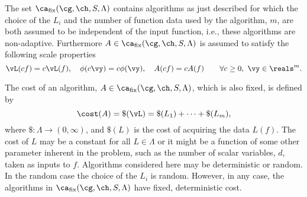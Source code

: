 \documentclass[final]{elsarticle}
\theoremstyle{definition}
\theoremstyle{remark}
\DeclareMathOperator{\fix}{fix}
\begin{document}
The set $\ca_{\fix}(\cg,\ch,S,\Lambda)$ contains algorithms as just described for which the choice of the $L_i$ and the number of function data used by the algorithm, $m$, are both assumed to be independent of the input function, i.e., these algorithms are non-adaptive.  Furthermore $A \in \ca_{\fix}(\cg,\ch,S,\Lambda)$ is assumed to satisfy the following scale properties
\begin{equation}
\label{algoscale}
\vL(cf) = c \vL(f), \quad 
\phi(c\vy) = c\phi(\vy), \quad A(cf) = cA(f) \qquad \forall c \ge 0, \ \vy \in \reals^m.
\end{equation}

The cost of an algorithm, $A \in  \ca_{\fix}(\cg,\ch,S,\Lambda)$, which is also fixed, is defined by
\begin{equation} \label{costfix}
\cost(A) = \$(\vL) = \$(L_1) + \cdots +\$(L_m),
\end{equation}
where $\$:\Lambda \to (0,\infty)$, and $\$(L)$ is the cost of acquiring the data $L(f)$. The cost of $L$ may be a constant for all $L \in \Lambda$ or it might be a function of some other parameter inherent in the problem, such as the number of scalar variables, $d$, taken as inputs to $f$. Algorithms considered here may be deterministic or random.  In the random case the choice of the $L_i$ is random.  However, in any case, the algorithms in $\ca_{\fix}(\cg,\ch,S,\Lambda)$ have fixed, deterministic cost.
\end{document}
